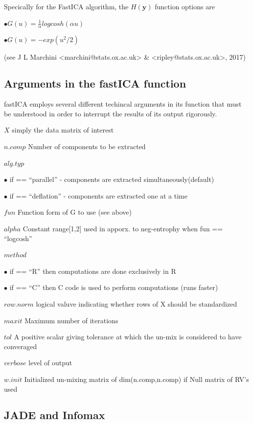 \documentclass[12pt,twoside]{amherstthesis}
\begin{document}
  Specically for the FastICA algorithm, the \(H(\textbf{y})\) function
  options are
  
  \(\bullet G(u) = \frac{1}{\alpha}log cosh(\alpha u)\)
  
  \(\bullet G(u) = -exp(u^2/2)\)
  
  (see J L Marchini \textless{}marchini@stats.ox.ac.uk\textgreater{} \&
  \textless{}ripley@stats.ox.ac.uk\textgreater{}, 2017)
  
  \subsection{Arguments in the fastICA
  function}\label{arguments-in-the-fastica-function}
  
  fastICA employs several different techincal arguments in its function
  that must be understood in order to interrupt the results of its output
  rigorously.
  
  \(X\) simply the data matrix of interest
  
  \(n.comp\) Number of components to be extracted
  
  \(alg.typ\)
  
  \(\bullet\) if == ``parallel'' - components are extracted
  simultaneously(default)
  
  \(\bullet\) if == ``deflation'' - components are extracted one at a time
  
  \(fun\) Function form of G to use (see above)
  
  \(alpha\) Constant range{[}1,2{]} used in apporx. to neg-entrophy when
  fun == ``logcosh''
  
  \(method\)
  
  \(\bullet\) if == ``R'' then computations are done exclusively in R
  
  \(\bullet\) if == ``C'' then C code is used to perform computations
  (runs faster)
  
  \(row.norm\) logical valuve indicating whether rows of X should be
  standardized
  
  \(maxit\) Maximum number of iterations
  
  \(tol\) A positive scalar giving tolerance at which the un-mix is
  considered to have converaged
  
  \(verbose\) level of output
  
  \(w.init\) Initialized un-mixing matrix of dim(n.comp,n.comp) if Null
  matrix of RV's used
  
  \subsection{JADE and Infomax}\label{jade-and-infomax}
  
\end{document}
